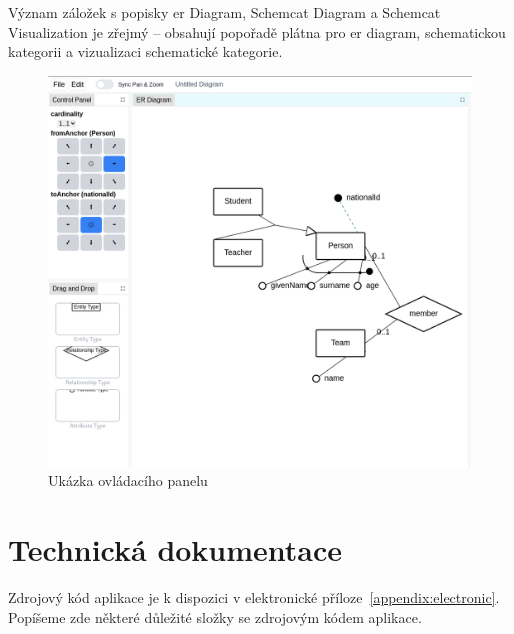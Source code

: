 Význam záložek s popisky \acrshort{er} Diagram, Schemcat Diagram a Schemcat Visualization je zřejmý -- obsahují popořadě plátna pro \acrshort{er} diagram, schematickou kategorii a vizualizaci schematické kategorie.

\begin{figure}[!htb]
  \centering
  \includegraphics[width=\maxwidth{\textwidth}]{../img/app/control-panel.png}
  \caption{Ukázka ovládacího panelu}
  \label{fig:control-panel}
\end{figure}

\section{Technická dokumentace}

Zdrojový kód aplikace je k dispozici v elektronické příloze~\ref{appendix:electronic}.
Popíšeme zde některé důležité složky se zdrojovým kódem aplikace.

